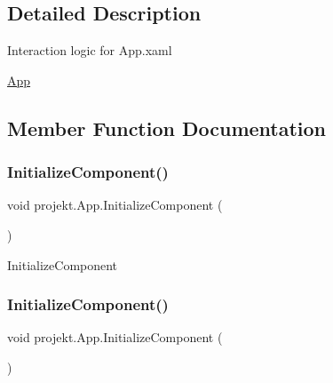 \subsection{Detailed Description}
Interaction logic for App.\+xaml 

\mbox{\hyperlink{classprojekt_1_1_app}{App}} 

\subsection{Member Function Documentation}
\mbox{\label{classprojekt_1_1_app_aadb8f9c97545ff79106a903c12558d38}} 
\subsubsection{\texorpdfstring{Initialize\+Component()}{InitializeComponent()}\hspace{0.1cm}{\footnotesize\ttfamily [1/9]}}
{\footnotesize\ttfamily void projekt.\+App.\+Initialize\+Component (\begin{DoxyParamCaption}{ }\end{DoxyParamCaption})\hspace{0.3cm}{\ttfamily [inline]}}



Initialize\+Component 

\mbox{\label{classprojekt_1_1_app_aadb8f9c97545ff79106a903c12558d38}} 
\subsubsection{\texorpdfstring{Initialize\+Component()}{InitializeComponent()}\hspace{0.1cm}{\footnotesize\ttfamily [2/9]}}
{\footnotesize\ttfamily void projekt.\+App.\+Initialize\+Component (\begin{DoxyParamCaption}{ }\end{DoxyParamCaption})\hspace{0.3cm}{\ttfamily [inline]}}



